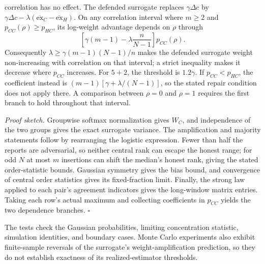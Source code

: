\begin{enumerate}
  correlation has no effect. The defended surrogate replaces
  \(\gamma\Delta c\) by
  \(\gamma\Delta c-\lambda(\overline{\mathrm{ex}}_C-\overline{\mathrm{ex}}_H)\).
  On any correlation interval where \(m\ge2\) and
  \(p_{CC}(\rho)\ge p_{HC}\), its log-weight advantage depends on
  \(\rho\) through \[
  \left[\gamma(m-1)-\lambda\frac{n}{N-1}\right]p_{CC}(\rho).
  \] Consequently \(\lambda\ge\gamma(m-1)(N-1)/n\) makes the defended
  surrogate weight non-increasing with correlation on that interval; a
  strict inequality makes it decrease where \(p_{CC}\) increases. For
  \(5+2\), the threshold is \(1.2\gamma\). If \(p_{CC}<p_{HC}\), the
  coefficient instead is \((m-1)[\gamma+\lambda/(N-1)]\), so the stated
  repair condition does not apply there. A comparison between \(\rho=0\)
  and \(\rho=1\) requires the first branch to hold throughout that
  interval.
\end{enumerate}

\emph{Proof sketch.} Groupwise softmax normalization gives \(W_C\), and
independence of the two groups gives the exact surrogate variance. The
amplification and majority statements follow by rearranging the logistic
expression. Fewer than half the reports are adversarial, so neither
central rank can escape the honest range; for odd \(N\) at most \(m\)
insertions can shift the median's honest rank, giving the stated
order-statistic bounds. Gaussian symmetry gives the bias bound, and
convergence of central order statistics gives its fixed-fraction limit.
Finally, the strong law applied to each pair's agreement indicators
gives the long-window matrix entries. Taking each row's actual maximum
and collecting coefficients in \(p_{CC}\) yields the two dependence
branches. \(\square\)

The tests check the Gaussian probabilities, limiting concentration
statistic, simulation identities, and boundary cases. Monte Carlo
experiments also exhibit finite-sample reversals of the surrogate's
weight-amplification prediction, so they do not establish exactness of
its realized-estimator thresholds.
